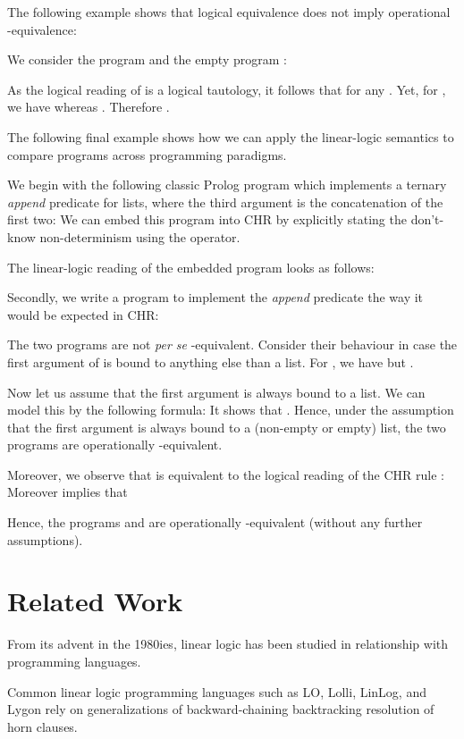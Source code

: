 \documentclass[acmtocl]{acmtrans2m}
\begin{document}
The following example shows that logical equivalence does not imply
operational -equivalence:

\begin{example}
We consider the program  and the empty
program :

As the logical reading  of  is a logical
tautology, it follows that  for any
. Yet, for , we have
 whereas .
Therefore . \end{example}

The following final example shows how we can apply the linear-logic
semantics to compare programs across programming paradigms.

\begin{example}
\label{example:append}
We begin with the following
classic Prolog program which implements a ternary \emph{append} predicate for
lists, where the third argument is the concatenation of the first two: 
We can embed this program into CHR by explicitly stating the
don't-know non-determinism using the  operator.

The linear-logic reading of the embedded program looks as follows:
  
Secondly, we write a program to implement the \emph{append} predicate the way it
would be expected in CHR:

The two programs are not \emph{per se} -equivalent. Consider their
behaviour in case the first argument of  is bound to anything else than a list. For
, we have 
but  .

Now let us assume that the first argument is always bound to a list. We can model
this by the following formula:  It shows that
. Hence, under the
assumption that the first argument is always bound to a (non-empty or empty)
list, the two programs are operationally -equivalent.

Moreover, we observe that  is equivalent to the logical reading of the
CHR rule :  Moreover
 implies that

Hence, the programs  and  are operationally -equivalent (without any further assumptions).
\end{example}

\section{Related Work}
\label{sec:related}

From its advent in the 1980ies, linear logic has been studied in relationship
with programming languages.

Common linear logic programming languages such as
LO\cite{DBLP:conf/oopsla/AndreoliP90}, Lolli\cite{DBLP:conf/lics/HodasM91},
LinLog\cite{Andreoli92logicprogramming}, and
Lygon\cite{DBLP:conf/amast/HarlandPW96} rely on generalizations of
backward-chaining backtracking resolution of horn clauses.
\end{document}
